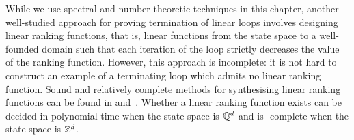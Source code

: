 While we use spectral and number-theoretic techniques in this chapter,
another well-studied approach for proving termination of linear loops
involves designing linear ranking functions, that is, linear functions
from the state space to a well-founded domain such that each iteration
of the loop strictly decreases the value of the ranking
function. However, this approach is incomplete: it is not hard to
construct an example of a terminating loop which admits no linear
ranking function.  Sound and relatively complete methods for
synthesising linear ranking functions can be found in
\cite{PodelskiR04} and~\cite{Ben-AmramG13}. Whether a linear
ranking function exists can be decided in polynomial time when the
state space is $\mathbb{Q}^{d}$ and is \coNP-complete when the
state space is $\mathbb{Z}^{d}$.
